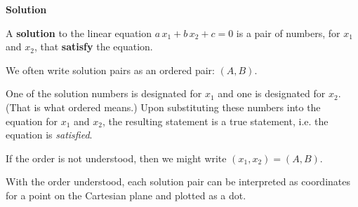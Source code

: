 \documentclass{ximera}
\begin{document}
\begin{definition} \textbf{\textcolor{green!50!black}{Solution}} 


A \textbf{solution} to the linear equation  $a \, x_1 + b \, x_2 + c = 0$ is a pair of numbers, for $x_1$ and $x_2$, that \textbf{satisfy} the equation.


\end{definition}

\begin{notation}


We often write solution pairs as an ordered pair: $(A, B)$. 


One of the solution numbers is designated for $x_1$ and one is designated for $x_2$.  (That is what ordered means.) Upon substituting these numbers into the equation for $x_1$ and $x_2$, the resulting statement is a true statement, i.e. the equation is \textit{satisfied}. 

If the order is not understood, then we might write $(x_1, x_2) = (A, B)$.


\end{notation}





With the order understood, each solution pair can be interpreted as coordinates for a point on the Cartesian plane and plotted as a dot.
\end{document}
